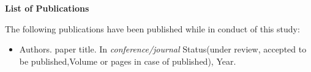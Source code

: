 \cleardoublepage
{}
{}
\pagestyle{plain}
\vfill
\begin{center}{\huge{\textbf{List of Publications}} \par}\end{center}
\vfill
The following publications have been published while in conduct of this study:
\vspace{20pt}
\begin{itemize} 

\item Authors.  paper title. In \textit{conference/journal} Status(under review, accepted to be published,Volume or pages in case of published), Year.



\end{itemize}

\vfill\vfill\vfill\vfill\vfill\vfill\null
\clearpage


